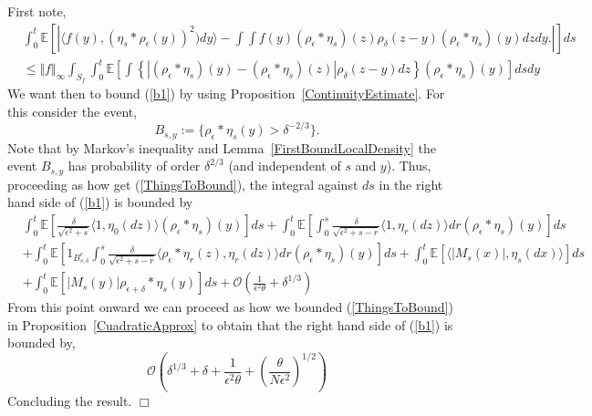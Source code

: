 \documentclass[12pt]{article}
\newenvironment {proof}{{\noindent\bf Proof }}{\hfill $\Box$ \medskip}
\newcommand{\IE}{\mathbb E}
\begin{document}
\begin{proof}
First note,
\begin{align}
&\int_0^t \mathbb{E}\left[| \langle f(y), (\eta_s * \rho_\epsilon(y))^2) dy \rangle - \int \int f(y) (\rho_\epsilon * \eta_s)(z) \rho_\delta (z-y) (\rho_\epsilon * \eta_s)(y) dz dy. |\right] ds \nonumber \\ &\leq  \Vert f \Vert_\infty \int_{S_f}  \int_0^t  \mathbb{E}\left[ \int \left\{ \left|(\rho_\epsilon * \eta_s)(y)-(\rho_\epsilon * \eta_s)(z) \right|   \rho_\delta(z-y) dz \right\} (\rho_\epsilon *\eta_s)(y) \right] ds  dy \label{b1}
\end{align}
We want then to bound (\ref{b1}) by using Proposition~\ref{ContinuityEstimate}. For this consider the event,
\[ B_{s,y} := \{ \rho_\epsilon * \eta_s(y) > \delta^{-2/3} \}. \]
Note that by Markov's inequality and Lemma~\ref{FirstBoundLocalDensity} the event $B_{s,y}$ has probability of order $\delta^{2/3}$ (and independent of $s$ and $y$). Thus, proceeding as how get (\ref{ThingsToBound}), the integral against $ds$ in the right hand side of (\ref{b1}) is bounded by
\begin{align}
&\int_0^t \IE[ \frac{\delta}{\sqrt{\epsilon^2 + s}} \langle 1,\eta_0(dz) \rangle (\rho_\epsilon *\eta_s)(y) ] ds +  \int_0^t \IE[  \int_0^s \frac{\delta}{\sqrt{\epsilon^2 + s - r}} \langle 1, \eta_r (dz) \rangle dr(\rho_\epsilon *\eta_s)(y)  ] ds \nonumber\\ & + \int_0^t \IE[   1_{B^c_{s,\delta}} \int_0^s \frac{\delta}{\sqrt{\epsilon^2 + s - r}} \langle \rho_\epsilon*\eta_r(z), \eta_r(dz) \rangle dr (\rho_\epsilon *\eta_s)(y) ] ds + \int_0^t \IE[\langle |M_s(x)|,\eta_s(dx) \rangle] ds \nonumber \\ & + \int_0^t  \IE[|M_s(y)|\rho_{\epsilon+\delta}*\eta_s(y)] ds  +\mathcal{O}\left( \frac{1}{\epsilon^2 \theta} + \delta^{1/3} \right)  \label{ThingsToBound2}
\end{align}
From this point onward we can proceed as how we bounded (\ref{ThingsToBound}) in Proposition~\ref{CuadraticApprox} to obtain that the right hand side of (\ref{b1}) is bounded by,
\[  \mathcal{O}\left(\delta^{1/3} + \delta+ \frac{1}{\epsilon^2 \theta} + \left( \frac{\theta}{N \epsilon^2}\right)^{1/2} \right)  \]
Concluding the result.
\end{proof}
\end{document}
